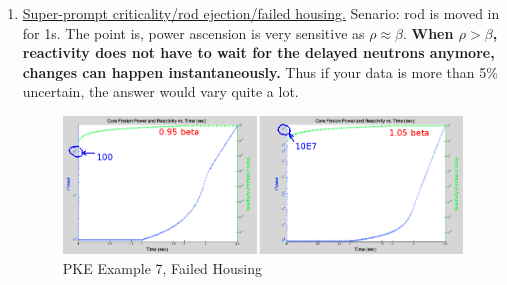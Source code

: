 \documentclass{school-22.211-notes}
\begin{document}
\begin{enumerate}
\item \uline{Super-prompt criticality/rod ejection/failed housing.} Senario: rod is moved in for 1s. The point is, power ascension is very sensitive as $\rho \approx \beta$. \textbf{When $\rho > \beta$, reactivity does not have to wait for the delayed neutrons anymore, changes can happen instantaneously.} Thus if your data is more than 5\% uncertain, the answer would vary quite a lot. 
  \begin{figure}[ht]
    \centering
    \includegraphics[width=6in]{images/pke/ex7.png}
    \caption{PKE Example 7, Failed Housing} 
  \end{figure}
  
\end{enumerate}
\end{document}
